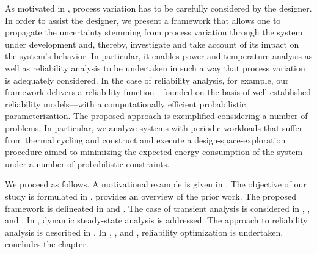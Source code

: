 As motivated in , process variation has to be carefully
considered by the designer. In order to assist the designer, we present a
framework that allows one to propagate the uncertainty stemming from process
variation through the system under development and, thereby, investigate and
take account of its impact on the system's behavior. In particular, it enables
power and temperature analysis as well as reliability analysis to be undertaken
in such a way that process variation is adequately considered. In the case of
reliability analysis, for example, our framework delivers a reliability
function---founded on the basis of well-established reliability models---with a
computationally efficient probabilistic parameterization. The proposed approach
is exemplified considering a number of problems. In particular, we analyze
systems with periodic workloads that suffer from thermal cycling and construct
and execute a design-space-exploration procedure aimed to minimizing the
expected energy consumption of the system under a number of probabilistic
constraints.

We proceed as follows. A motivational example is given in
. The objective of our study is formulated in
.  provides an overview of the prior work.
The proposed framework is delineated in  and
. The case of transient analysis is considered
in , , and
. In ,
dynamic steady-state analysis is addressed. The approach to reliability analysis
is described in . In
, , and
, reliability optimization is undertaken.
 concludes the chapter.

